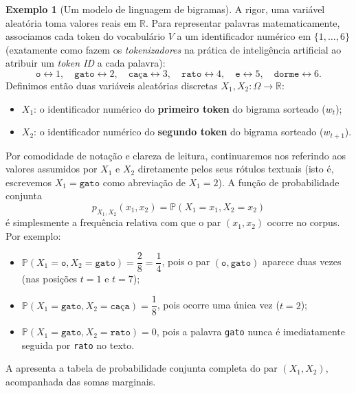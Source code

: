 \documentclass[12pt,portuguese]{article}
\theoremstyle{definition}
\newtheorem{example}[example]{Exemplo}
\begin{document}
\begin{example}[Um modelo de linguagem de bigramas]
A rigor, uma variável aleatória toma valores reais em $\mathbb{R}$. Para
representar palavras matematicamente, associamos cada token do vocabulário $V$
a um identificador numérico em $\{1,\ldots,6\}$ (exatamente como fazem os
\emph{tokenizadores} na prática de inteligência artificial ao atribuir um
\emph{token ID} a cada palavra):
\[
\texttt{o}\leftrightarrow 1,\quad
\texttt{gato}\leftrightarrow 2,\quad
\texttt{caça}\leftrightarrow 3,\quad
\texttt{rato}\leftrightarrow 4,\quad
\texttt{e}\leftrightarrow 5,\quad
\texttt{dorme}\leftrightarrow 6.
\]
Definimos então duas variáveis aleatórias discretas $X_1,X_2:\Omega\to\mathbb{R}$:
\begin{itemize}
\item $X_1$: o identificador numérico do \textbf{primeiro token} do bigrama sorteado ($w_t$);
\item $X_2$: o identificador numérico do \textbf{segundo token} do bigrama sorteado ($w_{t+1}$).
\end{itemize}
Por comodidade de notação e clareza de leitura, continuaremos nos referindo aos
valores assumidos por $X_1$ e $X_2$ diretamente pelos seus rótulos textuais (isto
é, escrevemos $X_1=\texttt{gato}$ como abreviação de $X_1=2$). A função de
probabilidade conjunta
\[
p_{X_1,X_2}(x_1,x_2)=\mathbb{P}(X_1=x_1, X_2=x_2)
\]
é simplesmente a frequência relativa com que o par $(x_1,x_2)$ ocorre no corpus.
Por exemplo:
\begin{itemize}
\item $\mathbb{P}(X_1=\texttt{o}, X_2=\texttt{gato}) = \dfrac{2}{8} = \dfrac{1}{4}$, pois o par $(\texttt{o},\texttt{gato})$ aparece duas vezes (nas posições $t=1$ e $t=7$);
\item $\mathbb{P}(X_1=\texttt{gato}, X_2=\texttt{caça}) = \dfrac{1}{8}$, pois ocorre uma única vez ($t=2$);
\item $\mathbb{P}(X_1=\texttt{gato}, X_2=\texttt{rato}) = 0$, pois a palavra \texttt{gato} nunca é imediatamente seguida por \texttt{rato} no texto.
\end{itemize}

A  apresenta a tabela de probabilidade conjunta completa do
par $(X_1,X_2)$, acompanhada das somas marginais.

\begin{table}[H]
\centering
\setlength{\tabcolsep}{5.1pt}


\end{table}
\end{example}
\end{document}

